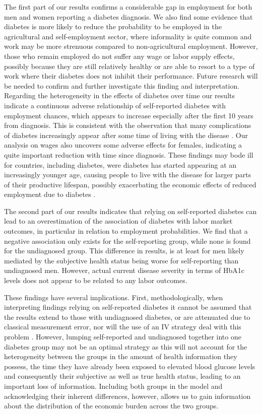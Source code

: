 \documentclass[12pt,english]{article}
\begin{document}
The first part of our results confirms a considerable gap in employment for both men and women reporting a diabetes diagnosis. We also find some evidence that diabetes is more likely to reduce the probability to be employed in the agricultural and self-employment sector, where informality is quite common and work may be more strenuous compared to non-agricultural employment. However, those who remain employed do not suffer any wage or labor supply effects, possibly because they are still relatively healthy or are able to resort to a type of work where their diabetes does not inhibit their performance. Future research will be needed to confirm and further investigate this finding and interpretation. Regarding the heterogeneity in the effects of diabetes over time our results indicate a continuous adverse relationship of self-reported diabetes with employment chances, which appears to increase especially after the first 10 years from diagnosis. This is consistent with the observation that many complications of diabetes increasingly appear after some time of living with the disease \parencite{Adler2003}. Our analysis on wages also uncovers some adverse effects for females, indicating a quite important reduction with time since diagnosis. These findings may bode ill for countries, including diabetes, were diabetes has started appearing at an increasingly younger age, causing people to live with the disease for larger parts of their productive lifespan, possibly exacerbating the economic effects of reduced employment due to diabetes \parencite{Hu2011,Villalpando2010}.

The second part of our results indicates that relying on self-reported diabetes can lead to an overestimation of the association of diabetes with labor market outcomes, in particular in relation to employment probabilities. We find that a negative association only exists for the self-reporting group, while none is found for the undiagnosed group. This difference in results, is at least for men likely mediated by the subjective health status being worse for self-reporting than undiagnosed men. However, actual current disease severity in terms of \ac{HbA1c} levels does not appear to be related to any labor outcomes.

These findings have several implications. First, methodologically, when interpreting findings relying on self-reported diabetes it cannot be assumed that the results extend to those with undiagnosed diabetes, or are attenuated due to classical measurement error, nor will the use of an \ac{IV} strategy deal with this problem \parencite{Cawley2015}. However, lumping self-reported and undiagnosed together into one diabetes group may not be an optimal strategy as this will not account for the heterogeneity between the groups in the amount of health information they possess, the time they have already been exposed to elevated blood glucose levels and consequently their subjective as well as true health status, leading to an important loss of information. Including both groups in the model and acknowledging their inherent differences, however, allows us to gain information about the distribution of the economic burden across the two groups. 
\end{document}
